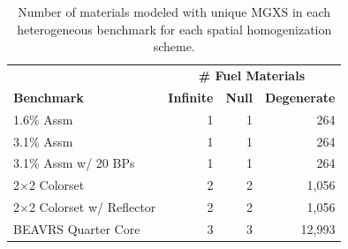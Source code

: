 \vspace{0.2in}

\begin{table}[h!]
  \centering
  \caption[Number of materials for each spatial homogenization scheme]{Number of materials modeled with unique \ac{MGXS} in each heterogeneous benchmark for each spatial homogenization scheme.}
  \small
  \label{table:chap8-num-materials}
  \vspace{6pt}
  \begin{tabular}{l r r r}
  \toprule
  \rowcolor{lightgray}
  & \multicolumn{3}{c}{\cellcolor{lightgray} \bf \# Fuel Materials} \\
  \multirow{-2}{*}{\cellcolor{lightgray} \bf Benchmark} &
  \multicolumn{1}{c}{\cellcolor{lightgray} \bf Infinite} &
  \multicolumn{1}{c}{\cellcolor{lightgray} \bf Null} &
  \multicolumn{1}{c}{\cellcolor{lightgray} \bf Degenerate} \\
  \midrule
1.6\% Assm & 1 & 1 & 264 \\
  \midrule
3.1\% Assm & 1 & 1 & 264 \\
  \midrule
3.1\% Assm w/ 20 BPs & 1 & 1 & 264  \\
  \midrule
2$\times$2 Colorset & 2 & 2 & 1,056 \\
  \midrule
2$\times$2 Colorset w/ Reflector & 2 & 2 & 1,056 \\
  \midrule
\ac{BEAVRS} Quarter Core & 3 & 3 & 12,993 \\ %
  \bottomrule
\end{tabular}
\end{table}

